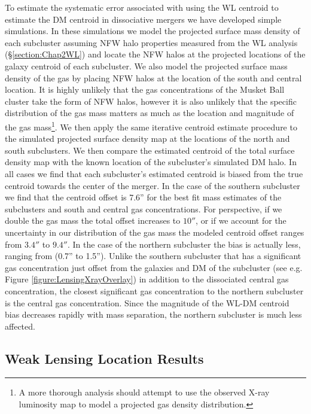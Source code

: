 To estimate the systematic error associated with using the WL centroid to estimate the DM centroid in dissociative mergers we have developed simple simulations.
In these simulations we model the projected surface mass density of each subcluster assuming NFW halo properties measured from the WL analysis (\S\ref{section:Chap2WL}) and locate the NFW halos at the projected locations of the galaxy centroid of each subcluster.
We also model the projected surface mass density of the gas by placing NFW halos at the location of the south and central location.
It is highly unlikely that the gas concentrations of the Musket Ball cluster take the form of NFW halos, however it is also unlikely that the specific distribution of the gas mass matters as much as the location and magnitude of the gas mass\footnote{A more thorough analysis should attempt to use the observed X-ray luminosity map to model a projected gas density distribution.}.
We then apply the same iterative centroid estimate procedure to the simulated projected surface density map at the locations of the north and south subclusters.
We then compare the estimated centroid of the total surface density map with the known location of the subcluster's simulated DM halo.
In all cases we find that each subcluster's estimated centroid is biased from the true centroid towards the center of the merger.
In the case of the southern subcluster we find that the centroid offset is 7.6'' for the best fit mass estimates of the subclusters and south and central gas concentrations.
For perspective, if we double the gas mass the total offset increases to $10''$, or if we account for the uncertainty in our distribution of the gas mass the modeled centroid offset ranges from $3.4''$ to $9.4''$.
In the case of the northern subcluster the bias is actually less, ranging from (0.7'' to 1.5'').
Unlike the southern subcluster that has a significant gas concentration just offset from the galaxies and DM of the subcluster (see e.g. Figure \ref{figure:LensingXrayOverlay}) in addition to the dissociated central gas concentration, the closest significant gas concentration to the northern subcluster is the central gas concentration.
Since the magnitude of the WL-DM centroid bias decreases rapidly with mass separation, the northern subcluster is much less affected.

\subsection{Weak Lensing Location Results}


